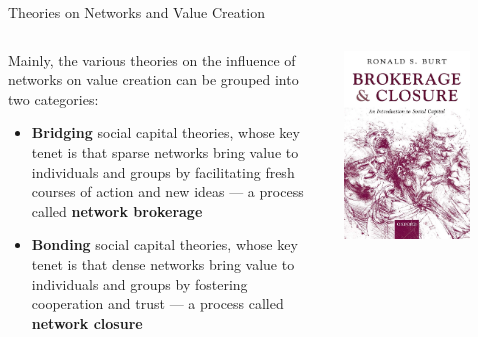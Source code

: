 \documentclass[notes, aspectratio=1610]{beamer}
\begin{document}
\begin{frame}{Theories on Networks and Value Creation}
\begin{columns}
	\begin{column}{0.5\textwidth}
	Mainly, the various theories on the influence of networks on value 
	creation can be grouped into two categories:

	\vspace{1em}

	\begin{itemize}
		\item \textbf{Bridging} social capital theories, whose key 
		      tenet is that sparse networks bring value to 
		      individuals and groups by facilitating fresh courses 
		      of action and new ideas --- a process called 
		      \textbf{network brokerage} 
		\item \textbf{Bonding} social capital theories, whose key 
		      tenet is that dense networks bring value to 
		      individuals and groups by fostering cooperation and trust
		      ---  a process called \textbf{network closure}
	\end{itemize}
	\end{column}
	\begin{column}{0.5\textwidth}
		\centering
		\includegraphics[width=0.75\textwidth]{images/brokerage_and_closure.jpeg}
	\end{column}
\end{columns}
\end{frame}
\end{document}
